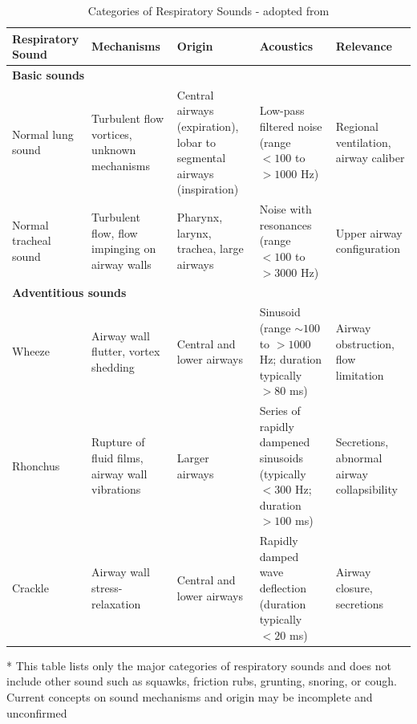 \begin{table}[H]
\centering
\footnotesize
\caption{Categories of Respiratory Sounds - adopted from \cite{pasterkamp_respiratory_1997}}
\label{tab:resp_sounds}

\begin{tabularx}{\textwidth}{lXXXX}
\toprule
\textbf{Respiratory Sound} & \textbf{Mechanisms} & \textbf{Origin} & \textbf{Acoustics} & \textbf{Relevance} \\
\midrule

\multicolumn{5}{l}{\textbf{Basic sounds}} \\
\addlinespace

Normal lung sound &
Turbulent flow vortices, unknown mechanisms &
Central airways (expiration), lobar to segmental airways (inspiration) &
Low-pass filtered noise (range $<100$ to $>1000$ Hz) &
Regional ventilation, airway caliber \\
\addlinespace

Normal tracheal sound &
Turbulent flow, flow impinging on airway walls &
Pharynx, larynx, trachea, large airways &
Noise with resonances (range $<100$ to $>3000$ Hz) &
Upper airway configuration \\
\midrule

\multicolumn{5}{l}{\textbf{Adventitious sounds}} \\
\addlinespace

Wheeze &
Airway wall flutter, vortex shedding &
Central and lower airways &
Sinusoid (range $\sim100$ to $>1000$ Hz; duration typically $>80$ ms) &
Airway obstruction, flow limitation \\
\addlinespace

Rhonchus &
Rupture of fluid films, airway wall vibrations &
Larger airways &
Series of rapidly dampened sinusoids (typically $<300$ Hz; duration $>100$ ms) &
Secretions, abnormal airway collapsibility \\
\addlinespace

Crackle &
Airway wall stress-relaxation &
Central and lower airways &
Rapidly damped wave deflection (duration typically $<20$ ms) &
Airway closure, secretions \\
\bottomrule
\end{tabularx}

\vspace{0.3cm}
\footnotesize{
* This table lists only the major categories of respiratory sounds and does not include other sound such as squawks, friction rubs, grunting, snoring, or cough. Current concepts on sound mechanisms and origin may be incomplete and unconfirmed
}
\end{table}